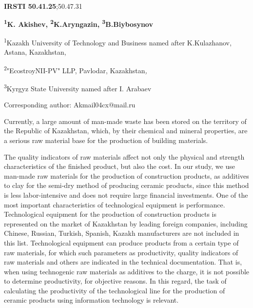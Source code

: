 \newpage
{\bfseries IRSTI 50.41.25};50.47.31


\begin{center}
{\bfseries \textsuperscript{1}K. Akishev\envelope,
\textsuperscript{2}K.Aryngazin, \textsuperscript{3}B.Biybosynov}

\textsuperscript{1}Kazakh University of Technology and Business named
after K.Kulazhanov, Astana, Kazakhstan,

\textsuperscript{2}"EcostroyNII-PV" LLP, Pavlodar, Kazakhstan\emph{,}

\textsuperscript{3}Kyrgyz State University named after I. Arabaev
\end{center}
\envelope Corresponding author: Akmail04cx@mail.ru \vspace{0.5cm}

Currently, a large amount of man-made waste has been stored on the
territory of the Republic of Kazakhstan, which, by their chemical and
mineral properties, are a serious raw material base for the production
of building materials.

The quality indicators of raw materials affect not only the physical and
strength characteristics of the finished product, but also the cost. In
our study, we use man-made raw materials for the production of
construction products, as additives to clay for the semi-dry method of
producing ceramic products, since this method is less labor-intensive
and does not require large financial investments. One of the most
important characteristics of technological equipment is performance.
Technological equipment for the production of construction products is
represented on the market of Kazakhstan by leading foreign companies,
including Chinese, Russian, Turkish, Spanish, Kazakh manufacturers are
not included in this list. Technological equipment can produce products
from a certain type of raw materials, for which such parameters as
productivity, quality indicators of raw materials and others are
indicated in the technical documentation. That is, when using
technogenic raw materials as additives to the charge, it is not possible
to determine productivity, for objective reasons. In this regard, the
task of calculating the productivity of the technological line for the
production of ceramic products using information technology is relevant.

